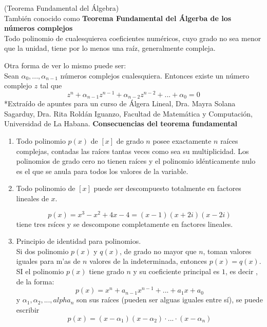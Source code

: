 \documentclass[10pt,twoside]{SelfArx} %
\begin{document}
\begin{teorema}
	(Teorema Fundamental del Álgebra)\\
	También conocido como \textbf{Teorema Fundamental del Álgerba de los números complejos}\\
	Todo polinomio de cualesquierea coeficientes numéricos, cuyo grado no sea menor que la unidad, tiene por lo menos una raíz, generalmente compleja.
	
\end{teorema}
Otra forma de ver lo mismo puede ser:\\
Sean $ \alpha_{0}, ...,\alpha_{n-1} $ números complejos cualesquiera. Entonces existe un número complejo $ z $ tal que
\begin{equation}
z^{n}+\alpha_{n-1} z^{n-1}+\alpha_{n-2}z^{n-2}+...+\alpha_{0}=0
\end{equation}
*Extraído de apuntes para un curso de Álgera Lineal, Dra. Mayra Solana Sagarduy, Dra. Rita Roldán Iguanzo, Facultad de Matemática y Computación, Universidad de La Habana. 
\textbf{Consecuencias del teorema fundamental}\\
\begin{enumerate}
	\item Todo polinomio $ p(x) $ de $ [x] $ de grado $ n $ posee exactamente $ n $ raíces complejas, contadas las raíces tantas veces como sea su multiplicidad. Los polinomios de grado cero no tienen raíces y el polinomio idénticamente nulo es el que se anula para todos los valores de la variable.
	\item Todo polinomio de $ [x] $ puede ser descompuesto totalmente en factores lineales de $ x $.\\
	\begin{ejemplo}
		\[ p(x)=x^{3}-x^{2}+4x-4=(x-1)(x+2i)(x-2i) \]
		tiene tres rsíces y se descompone completamente en factores lineales.
	\end{ejemplo}
	\item Principio de identidad para polinomios.\\
	Si dos polinomio $ p(x) $ y $ q(x) $, de grado no mayor que $ n $, toman valores iguales para m'as de $ n $ valores de la indeterminada, \textsf{entonces} $ p(x)=q(x) $.\\
	SI el polinomio $ p(x) $ tiene grado $ n $ y su coeficiente principal es $ 1 $, es decir , de la forma:
	\[ p(x)=x^{n}+a_{n-1}x^{n-1}+...+a_{1}x+a_{0} \]
	y $ \alpha_{1}, \alpha_{2}, ..., alpha_{n} $ son sus raíces (pueden ser alguas iguales entre sí), se puede escribir
	\begin{equation}
	p(x)=(x-\alpha_{1})(x-\alpha_{2})\cdot...\cdot(x-\alpha_{n})
	\end{equation}
\end{enumerate}
\end{document}
